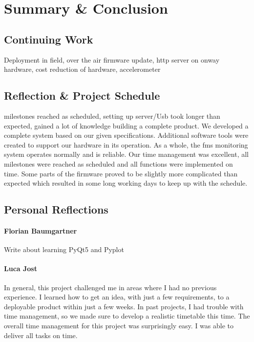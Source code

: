 \chapter{Summary \& Conclusion}

\section{Continuing Work}
Deployment in field, over the air firmware update, http server on onway hardware, cost reduction of hardware, accelerometer

\section{Reflection \& Project Schedule}
milestones reached as scheduled, setting up server/Usb took longer than expected, gained a lot of knowledge building a complete product.  
We developed a complete system based on our given specifications. Additional software tools were created to support our hardware in its operation. As a whole, the \acrfull{fms} monitoring system operates normally and is reliable. 
Our time management was excellent, all milestones were reached as scheduled and all functions were implemented on time. Some parts of the firmware proved to be slightly more complicated than expected which resulted in some long working days to keep up with the schedule. 

\newpage
\section{Personal Reflections}

\subsubsection{Florian Baumgartner}
Write about learning PyQt5 and Pyplot

\subsubsection{Luca Jost}
In general, this project challenged me in areas where I had no previous experience. I learned how to get an idea, with just a few requirements, to a deployable product within just a few weeks. In past projects, I had trouble with time management, so we made sure to develop a realistic timetable this time. The overall time management for this project was surprisingly easy. I was able to deliver all tasks on time. 
